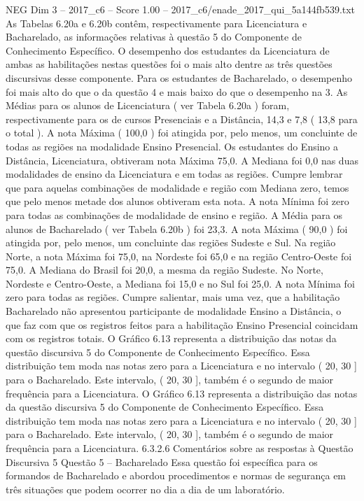 \begin{textsample}{NEG Dim 3 – 2017\_c6 – Score 1.00 – 2017\_c6/enade\_2017\_qui\_5a144fb539.txt}
As Tabelas 6.20a e 6.20b contêm, respectivamente para Licenciatura e Bacharelado, as informações relativas à questão 5 do Componente de Conhecimento Específico.
O desempenho dos estudantes da Licenciatura de ambas as habilitações nestas questões foi o mais alto dentre as três questões discursivas desse componente.
Para os estudantes de Bacharelado, o desempenho foi mais alto do que o da questão 4 e mais baixo do que o desempenho na 3.
As Médias para os alunos de Licenciatura ( ver Tabela 6.20a ) foram, respectivamente para os de cursos Presenciais e a Distância, 14,3 e 7,8 ( 13,8 para o total ).
A nota Máxima ( 100,0 ) foi atingida por, pelo menos, um concluinte de todas as regiões na modalidade Ensino Presencial.
Os estudantes do Ensino a Distância, Licenciatura, obtiveram nota Máxima 75,0.
A Mediana foi 0,0 nas duas modalidades de ensino da Licenciatura e em todas as regiões.
Cumpre lembrar que para aquelas combinações de modalidade e região com Mediana zero, temos que pelo menos metade dos alunos obtiveram esta nota.
A nota Mínima foi zero para todas as combinações de modalidade de ensino e região.
A Média para os alunos de Bacharelado ( ver Tabela 6.20b ) foi 23,3.
A nota Máxima ( 90,0 ) foi atingida por, pelo menos, um concluinte das regiões Sudeste e Sul.
Na região Norte, a nota Máxima foi 75,0, na Nordeste foi 65,0 e na região Centro-Oeste foi 75,0.
A Mediana do Brasil foi 20,0, a mesma da região Sudeste.
No Norte, Nordeste e Centro-Oeste, a Mediana foi 15,0 e no Sul foi 25,0.
A nota Mínima foi zero para todas as regiões.
Cumpre salientar, mais uma vez, que a habilitação Bacharelado não apresentou participante de modalidade Ensino a Distância, o que faz com que os registros feitos para a habilitação Ensino Presencial coincidam com os registros totais.
O Gráfico 6.13 representa a distribuição das notas da questão discursiva 5 do Componente de Conhecimento Específico.
Essa distribuição tem moda nas notas zero para a Licenciatura e no intervalo ( 20, 30 ] para o Bacharelado.
Este intervalo, ( 20, 30 ], também é o segundo de maior frequência para a Licenciatura.
O Gráfico 6.13 representa a distribuição das notas da questão discursiva 5 do Componente de Conhecimento Específico.
Essa distribuição tem moda nas notas zero para a Licenciatura e no intervalo ( 20, 30 ] para o Bacharelado.
Este intervalo, ( 20, 30 ], também é o segundo de maior frequência para a Licenciatura. 6.3.2.6 Comentários sobre as respostas à Questão Discursiva 5 Questão 5 – Bacharelado Essa questão foi específica para os formandos de Bacharelado e abordou procedimentos e normas de segurança em três situações que podem ocorrer no dia a dia de um laboratório.

\end{textsample}
